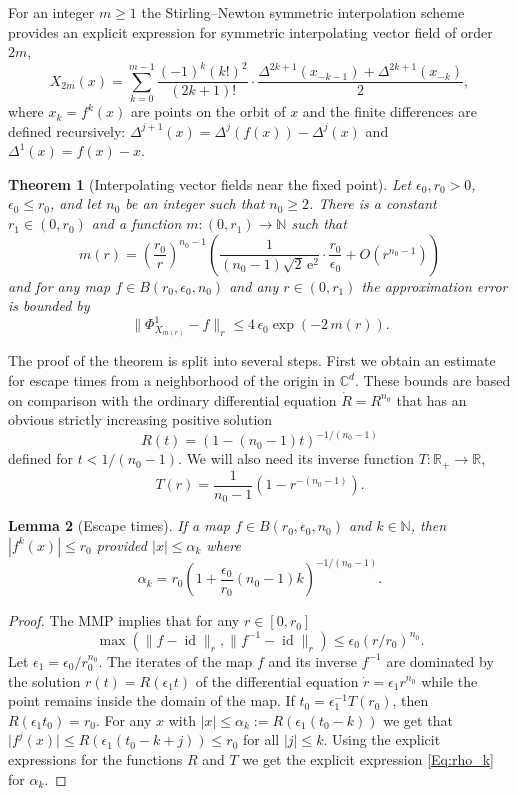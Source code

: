 \documentclass[a4paper,12pt]{article}
\newcommand{\N}{\mathbb{N}}
\newcommand{\C}{\mathbb{C}}
\newcommand\id{\operatorname{id}}
\newtheorem{thm}{Theorem}
\newtheorem{lemma}[thm]{Lemma}
\begin{document}
For an integer $m\ge1 $ the Stirling--Newton symmetric interpolation scheme
provides an explicit expression for 
  symmetric interpolating vector field of order $2m$,
 \begin{equation}\label{Eq:Xm-symmetric}
X_{2m}(x) = \sum_{k=0}^{m-1} \frac{(-1)^k (k!)^2}{(2k+1)!} \cdot 
\frac{\Delta^{2k+1} (x_{-k-1}) + \Delta^{2k+1} (x_{-k})}{2},
\end{equation}
where $x_k=f^k(x)$ are points on the orbit of $x$
and the finite differences are defined recursively: $\Delta ^{j+1}(x)=\Delta ^{j}(f(x))-\Delta ^{j}(x)$ and $\Delta^1(x)=f(x)-x$.

\begin{thm}[Interpolating vector fields near the fixed point]\label{Thm:nearfixedpoint}
Let $\epsilon_0,r_0>0$, $\epsilon_0\le r_0$, and let $n_0$ be an integer such that ${n_0}\ge 2$. 
There is a constant $r_1\in (0,r_0)$ and a function 
$m:(0,r_1)\to \N$ such that 
\[
m(r)=  \left(\frac{r_0}{r}\right)^{n_0-1}
\left(\frac{1}{(n_0-1)\sqrt2\,\mathrm e^2 }
\cdot\frac{r_0}{\epsilon_0} +O\left(r^{n_0-1}\right)
\right)
\]
and  for any map $f\in B(r_0,\epsilon_0,n_0)$ and  
 any $r\in(0,r_1)$ 
the approximation error is bounded by 
\[
\bigl\|\Phi_{X_{m(r)}}^1-f\bigr\|_{r}
\le 4 \, \epsilon_0 \exp\left(-2 \, m(r)\right).
\]
\end{thm}


The proof of the theorem is split into several steps. First we obtain
an estimate for escape times from a neighborhood
of the origin in $\C^d$.
These bounds are based on comparison with the ordinary differential equation
\(
\dot R=R^{n_0}
\)
that has an obvious  strictly increasing positive solution 
\[
R(t)=\left(1-(n_0-1)t\right)^{-1/(n_0-1)}
\]
defined for $t<1/(n_0-1)$. We will also need its inverse function
$T:\mathbb R_+\to \mathbb R$, 
\[
T(r)=\frac1{n_0-1}\left(1-r^{-(n_0-1)}\right).
\]

\begin{lemma}[Escape times]\label{Le:escape}
If a map $f\in B(r_0,\epsilon_0,n_0)$ and $k\in\N$, then 
$|f^{k}(x)|\le r_0$  provided   $|x|\le \alpha_k$
where
 \begin{equation}\label{Eq:rho_k}
 \alpha_k=r_0\left(1+\frac{\epsilon_0}{r_0}(n_0-1)k\right)^{-1/(n_0-1)}.
 \end{equation}
 \end{lemma}
\begin{proof}
The MMP implies that for any $r\in [0,r_0]$
\[
\max\left(\bigl\|f-\id\bigr\|_{r},\bigl\|f^{-1}-\id\bigr\|_{r}\right)\le  \epsilon_0 (r/r_0)^{n_0}. 
\]
Let $\epsilon_1=\epsilon_0/r_0^{n_0} $.
The iterates of the map $f$ and its inverse $f^{-1}$
are dominated by the solution 
$r(t)=R(\epsilon_1 t)$ of the differential equation
$\dot r=\epsilon_1r^{n_0}$ while the point remains inside the domain of the map. If $t_0=\epsilon_1^{-1}T(r_0)$, then $R(\epsilon_1 t_0)=r_0$. 
For any $x$ with $|x|\le \alpha_k:=R(\epsilon_1 (t_0-k))$ 
we get that $\bigl|f^j(x)\bigr|\le
R(\epsilon_1 (t_0-k+j))\le r_0$
 for all $|j|\le k$. Using the explicit expressions for the functions $R$ and $T$ 
 we get the explicit expression \eqref{Eq:rho_k} for $\alpha_k$.
\end{proof}
\end{document}
